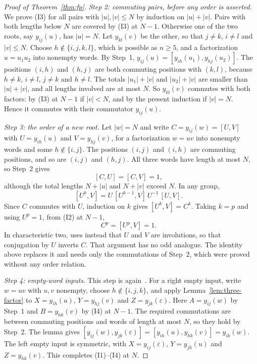 \begin{proof}[Proof of Theorem~\ref{thm:fp}]
\emph{Step 2: commuting pairs, before any order is asserted.} We prove (I3) for all pairs with $|u|,|v|\leq N$ by
induction on $|u|+|v|$. Pairs with both lengths below $N$ are covered by (I3) at $N-1$. Otherwise one of the two roots,
say $y_{ij}(u)$, has $|u|=N$. Let $y_{kl}(v)$ be the other, so that $j\neq k$, $i\neq l$ and $|v|\leq N$. Choose
$h\notin\{i,j,k,l\}$, which is possible as $n\geq5$, and a factorization $u=u_1u_2$ into nonempty words. By Step~1,
$y_{ij}(u)=[y_{ih}(u_1),y_{hj}(u_2)]$. The positions $(i,h)$ and $(h,j)$ are both commuting positions with $(k,l)$,
because $h\neq k$, $i\neq l$, $j\neq k$ and $h\neq l$. The totals $|u_1|+|v|$ and $|u_2|+|v|$ are smaller than
$|u|+|v|$, and all lengths involved are at most $N$. So $y_{kl}(v)$ commutes with both factors: by (I3) at $N-1$ if
$|v|<N$, and by the present induction if $|v|=N$. Hence it commutes with their commutator $y_{ij}(u)$.

\emph{Step 3: the order of a new root.} Let $|w|=N$ and write $C=y_{ij}(w)=[U,V]$ with $U=y_{ih}(u)$ and
$V=y_{hj}(v)$, for a factorization $w=uv$ into nonempty words and some $h\notin\{i,j\}$. The positions $(i,j)$ and
$(i,h)$ are commuting positions, and so are $(i,j)$ and $(h,j)$. All three words have length at most $N$, so Step~2
gives
\[
 [C,U]=[C,V]=1,
\]
although the total lengths $N+|u|$ and $N+|v|$ exceed $N$. In any group,
\[
 [U^k,V]=U\,[U^{k-1},V]\,U^{-1}\,[U,V].
\]
Since $C$ commutes with $U$, induction on $k$ gives $[U^k,V]=C^k$. Taking $k=p$ and using $U^p=1$, from (I2) at
$N-1$,
\[
 C^p=[U^p,V]=1.
\]
In characteristic two, \cite{OAI247periodic} uses instead that $U$ and $V$ are involutions, so that conjugation by $U$
inverts $C$. That argument has no odd analogue. The identity above replaces it and needs only the commutations of
Step~2, which were proved without any order relation.

\emph{Step 4: empty-word inputs.} This step is again~\cite[proof of Theorem~4.1]{OAI247periodic}. For a right empty
input, write $w=uv$ with $u,v$ nonempty, choose $h\notin\{i,j,k\}$, and apply Lemma~\ref{lem:three-factor} to
$X=y_{ih}(u)$, $Y=y_{hj}(v)$ and $Z=y_{jk}(\varepsilon)$. Here $A=y_{ij}(w)$ by Step~1 and $B=y_{hk}(v)$ by (I4) at
$N-1$. The required commutations are between commuting positions and words of length at most $N$, so they hold by
Step~2. The lemma gives $[y_{ij}(w),y_{jk}(\varepsilon)]=[y_{ih}(u),y_{hk}(v)]=y_{ik}(w)$. The left empty input is
symmetric, with $X=y_{ij}(\varepsilon)$, $Y=y_{jh}(u)$ and $Z=y_{hk}(v)$. This completes (I1)--(I4) at $N$.


\end{proof}

